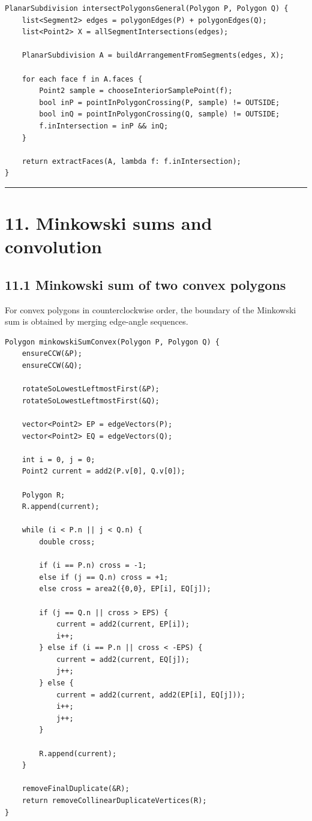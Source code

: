 \documentclass[11pt]{article}
\begin{document}
\begin{verbatim}
PlanarSubdivision intersectPolygonsGeneral(Polygon P, Polygon Q) {
    list<Segment2> edges = polygonEdges(P) + polygonEdges(Q);
    list<Point2> X = allSegmentIntersections(edges);

    PlanarSubdivision A = buildArrangementFromSegments(edges, X);

    for each face f in A.faces {
        Point2 sample = chooseInteriorSamplePoint(f);
        bool inP = pointInPolygonCrossing(P, sample) != OUTSIDE;
        bool inQ = pointInPolygonCrossing(Q, sample) != OUTSIDE;
        f.inIntersection = inP && inQ;
    }

    return extractFaces(A, lambda f: f.inIntersection);
}
\end{verbatim}

\begin{center}\rule{0.5\linewidth}{0.5pt}\end{center}

\section{11. Minkowski sums and
convolution}\label{minkowski-sums-and-convolution}

\subsection{11.1 Minkowski sum of two convex
polygons}\label{minkowski-sum-of-two-convex-polygons}

For convex polygons in counterclockwise order, the boundary of the
Minkowski sum is obtained by merging edge-angle sequences.

\begin{verbatim}
Polygon minkowskiSumConvex(Polygon P, Polygon Q) {
    ensureCCW(&P);
    ensureCCW(&Q);

    rotateSoLowestLeftmostFirst(&P);
    rotateSoLowestLeftmostFirst(&Q);

    vector<Point2> EP = edgeVectors(P);
    vector<Point2> EQ = edgeVectors(Q);

    int i = 0, j = 0;
    Point2 current = add2(P.v[0], Q.v[0]);

    Polygon R;
    R.append(current);

    while (i < P.n || j < Q.n) {
        double cross;

        if (i == P.n) cross = -1;
        else if (j == Q.n) cross = +1;
        else cross = area2({0,0}, EP[i], EQ[j]);

        if (j == Q.n || cross > EPS) {
            current = add2(current, EP[i]);
            i++;
        } else if (i == P.n || cross < -EPS) {
            current = add2(current, EQ[j]);
            j++;
        } else {
            current = add2(current, add2(EP[i], EQ[j]));
            i++;
            j++;
        }

        R.append(current);
    }

    removeFinalDuplicate(&R);
    return removeCollinearDuplicateVertices(R);
}
\end{verbatim}
\end{document}
